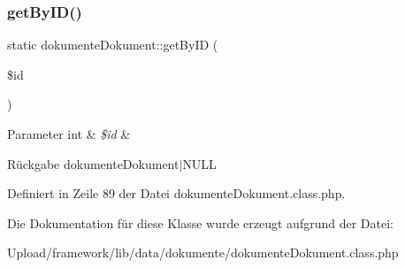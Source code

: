 \subsubsection{\texorpdfstring{get\+By\+I\+D()}{getByID()}}
{\footnotesize\ttfamily static dokumente\+Dokument\+::get\+By\+ID (\begin{DoxyParamCaption}\item[{}]{\$id }\end{DoxyParamCaption})\hspace{0.3cm}{\ttfamily [static]}}


\begin{DoxyParams}[1]{Parameter}
int & {\em \$id} & \\
\hline
\end{DoxyParams}
\begin{DoxyReturn}{Rückgabe}
dokumente\+Dokument$\vert$\+N\+U\+LL 
\end{DoxyReturn}


Definiert in Zeile 89 der Datei dokumente\+Dokument.\+class.\+php.



Die Dokumentation für diese Klasse wurde erzeugt aufgrund der Datei\+:\begin{DoxyCompactItemize}
\item 
Upload/framework/lib/data/dokumente/dokumente\+Dokument.\+class.\+php\end{DoxyCompactItemize}
